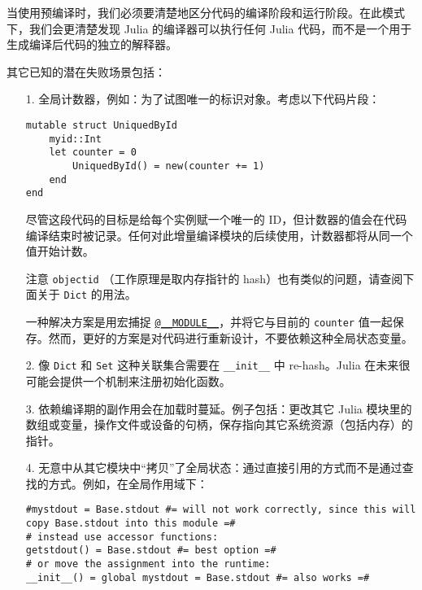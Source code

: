 当使用预编译时，我们必须要清楚地区分代码的编译阶段和运行阶段。在此模式下，我们会更清楚发现 Julia 的编译器可以执行任何 Julia 代码，而不是一个用于生成编译后代码的独立的解释器。



其它已知的潜在失败场景包括：



\begin{itemize}
\item[1. ] 全局计数器，例如：为了试图唯一的标识对象。考虑以下代码片段：


\begin{verbatim}
mutable struct UniquedById
    myid::Int
    let counter = 0
        UniquedById() = new(counter += 1)
    end
end
\end{verbatim}

尽管这段代码的目标是给每个实例赋一个唯一的 ID，但计数器的值会在代码编译结束时被记录。任何对此增量编译模块的后续使用，计数器都将从同一个值开始计数。

注意 \texttt{objectid} （工作原理是取内存指针的 hash）也有类似的问题，请查阅下面关于 \texttt{Dict} 的用法。

一种解决方案是用宏捕捉 \hyperlink{8796901235206560169}{\texttt{@\_\_MODULE\_\_}}，并将它与目前的 \texttt{counter} 值一起保存。然而，更好的方案是对代码进行重新设计，不要依赖这种全局状态变量。


\item[2. ] 像 \texttt{Dict} 和 \texttt{Set} 这种关联集合需要在 \texttt{\_\_init\_\_} 中 re-hash。Julia 在未来很可能会提供一个机制来注册初始化函数。


\item[3. ] 依赖编译期的副作用会在加载时蔓延。例子包括：更改其它 Julia 模块里的数组或变量，操作文件或设备的句柄，保存指向其它系统资源（包括内存）的指针。


\item[4. ] 无意中从其它模块中“拷贝”了全局状态：通过直接引用的方式而不是通过查找的方式。例如，在全局作用域下：


\begin{verbatim}
#mystdout = Base.stdout #= will not work correctly, since this will copy Base.stdout into this module =#
# instead use accessor functions:
getstdout() = Base.stdout #= best option =#
# or move the assignment into the runtime:
__init__() = global mystdout = Base.stdout #= also works =#
\end{verbatim}

\end{itemize}


